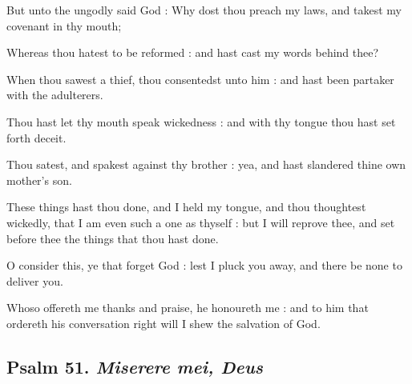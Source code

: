 But unto the ungodly said God : Why dost thou preach my laws, and takest my covenant in thy mouth;\par
{}Whereas thou hatest to be reformed : and hast cast my words behind thee?\par
{}When thou sawest a thief, thou consentedst unto him : and hast been partaker with the adulterers.\par
{}Thou hast let thy mouth speak wickedness : and with thy tongue thou hast set forth deceit.\par
{}Thou satest, and spakest against thy brother : yea, and hast slandered thine own mother's son.\par
{}These things hast thou done, and I held my tongue, and thou thoughtest wickedly, that I am even such a one as thyself : but I will reprove thee, and set before thee the things that thou hast done.\par
{}O consider this, ye that forget God : lest I pluck you away, and there be none to deliver you.\par
{}Whoso offereth me thanks and praise, he honoureth me : and to him that ordereth his conversation right will I shew the salvation of God.\par

\subsection{Psalm 51. \textit{Miserere mei, Deus}}

